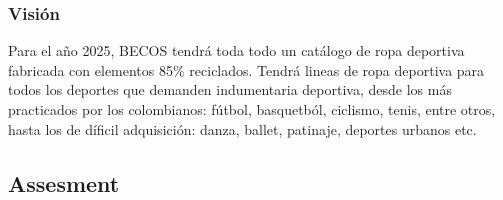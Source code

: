 \documentclass[11pt]{article}
\begin{document}
\subsubsection{Visión}
\label{sec:org57cb682}

Para el año 2025, BECOS tendrá toda todo un catálogo de ropa deportiva
fabricada con elementos 85\% reciclados. Tendrá lineas de ropa deportiva para
todos los deportes que demanden indumentaria deportiva, desde los más
practicados por los colombianos: fútbol, basquetból, ciclismo, tenis, entre
otros, hasta los de díficil adquisición: danza, ballet, patinaje,
deportes urbanos etc.

\subsection{Assesment}
\label{sec:org30cf688}
\end{document}
